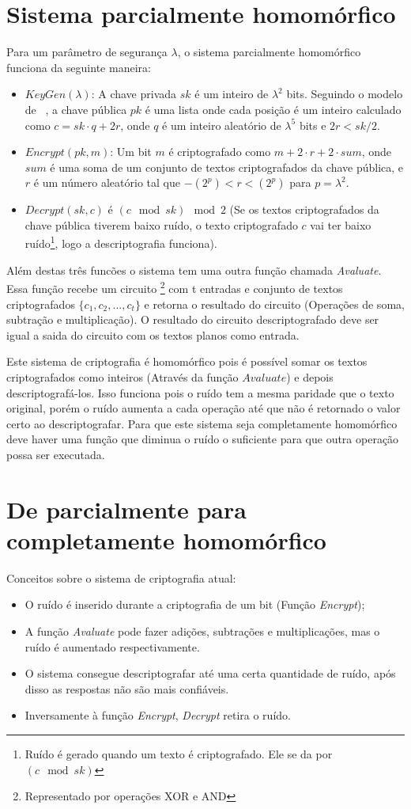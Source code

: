 \section{Sistema parcialmente homomórfico}
Para um parâmetro de segurança $\lambda$, o sistema parcialmente homomórfico funciona da seguinte maneira:
\begin{itemize}
	\item $KeyGen(\lambda)$: A chave privada $sk$ é um inteiro de $\lambda^2$  bits. Seguindo o modelo de ~\cite{rothblum}, a chave pública $pk$ é uma lista onde cada posição é um inteiro calculado como $c = sk \cdot q + 2r$, onde $q$ é um inteiro aleatório de $\lambda^5$ bits e $2r < sk/2$.
	\item $Encrypt(pk,m)$: Um bit $m$ é criptografado como $m + 2 \cdot r + 2 \cdot sum$, onde $sum$ é uma soma de um conjunto de textos criptografados da chave pública, e $r$ é um número aleatório tal que $-(2^p) < r < (2^p)$ para $p =  \lambda^2$.
	\item $Decrypt(sk,c)$ é $(c \mod sk) \mod 2$ (Se os textos criptografados da chave pública tiverem baixo ruído, o texto criptografado $c$ vai ter baixo ruído\footnote{Ruído é gerado quando um texto é criptografado. Ele se da por $(c \mod sk)$}, logo a descriptografia funciona).
\end{itemize}
Além destas três funcões o sistema tem uma outra função chamada \textit{Avaluate}. Essa função recebe um circuito \footnote{Representado por operações XOR e AND} com t entradas e conjunto de textos criptografados $\lbrace c_1,c_2,...,c_t \rbrace$ e retorna o resultado do circuito (Operações de soma, subtração e multiplicação). O resultado do circuito descriptografado deve ser igual a saida do circuito com os textos planos como entrada.

Este sistema de criptografia é homomórfico pois é possível somar os textos criptografados como inteiros (Através da função $Avaluate$) e depois descriptografá-los. Isso funciona pois o ruído tem a mesma paridade que o texto original, porém o ruído aumenta a cada operação até que não é retornado o valor certo ao descriptografar.
Para que este sistema seja completamente homomórfico deve haver uma função que diminua o ruído o suficiente para que outra operação possa ser executada.

\section{De parcialmente para completamente homomórfico}
Conceitos sobre o sistema de criptografia atual:
\begin{itemize}
	\item O ruído é inserido durante a criptografia de um bit (Função \textit{Encrypt});
	\item A função \textit{Avaluate} pode fazer adições, subtrações e multiplicações, mas o ruído é aumentado respectivamente.
	\item O sistema consegue descriptografar até uma certa quantidade de ruído, após disso as respostas não são mais confiáveis.
	\item Inversamente à função \textit{Encrypt}, \textit{Decrypt} retira o ruído.
\end{itemize}
  
